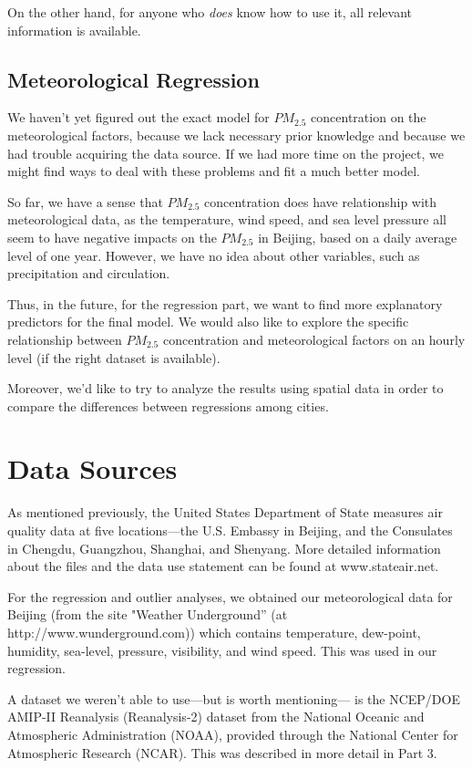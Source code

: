 \documentclass[11pt]{article} %
\begin{document}
On the other hand, for anyone who \emph{does} know how to use it, all relevant information is available.

\subsection{Meteorological Regression}

We haven't yet figured out the exact model for \(PM_{2.5}\) concentration on the meteorological factors, 
because we lack necessary prior knowledge and because we had trouble acquiring the data source. 
If we had more time on the project, we might find ways to deal with these problems and fit a much better model. 

So far, we have a sense that \(PM_{2.5}\) concentration does have relationship with meteorological data,
as the temperature, wind speed, and sea level pressure all seem to have negative impacts on the \(PM_{2.5}\) in Beijing, based on a daily average level of one year. 
However, we have no idea about other variables, such as precipitation and circulation. 

Thus, in the future, for the regression part, we want to find more explanatory predictors for the final model.
We would also like to explore the specific relationship between \(PM_{2.5}\) concentration and meteorological factors on an hourly level (if the right dataset is available). 

Moreover, we'd like to try to analyze the results using spatial data in order to compare the differences between regressions among cities.

\section{Data Sources}

As mentioned previously, the United States Department of State measures
air quality data at five locations---the U.S. Embassy in
Beijing, and the Consulates in Chengdu, Guangzhou,
Shanghai, and Shenyang. More detailed information about
the files and the data use statement can be found at www.stateair.net\cite{StateAirFS, StateAirDU}.

For the regression and outlier analyses, we obtained our meteorological data for Beijing (from the site "Weather Underground'' (at http://www.wunderground.com))
which contains temperature, dew-point, humidity, sea-level, pressure, visibility, and wind speed. This was used in our regression.

A dataset we weren't able to use---but is worth mentioning---
is the NCEP/DOE AMIP-II Reanalysis (Reanalysis-2) dataset 
from the National Oceanic and Atmospheric Administration
(NOAA)\cite{NOAA, NOAA2}, provided through 
the National Center for Atmospheric Research (NCAR). This was described in more detail in Part 3.
\end{document}
